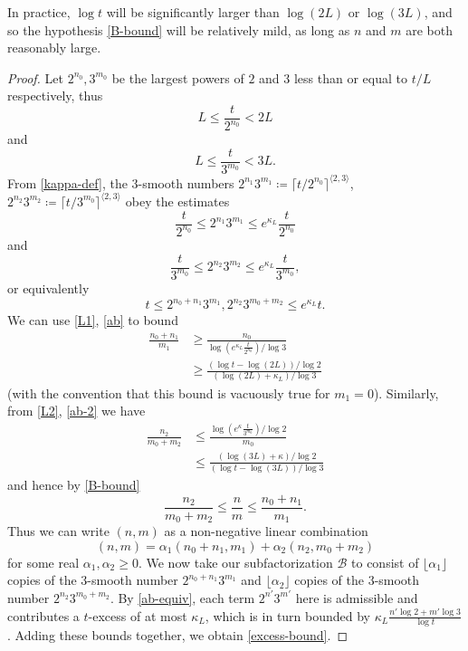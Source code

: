 \documentclass[12pt,a4paper,reqno]{amsart}
\numberwithin{equation}{section}
\theoremstyle{plain}
\theoremstyle{definition}
\newcommand\tuple{{\mathcal B}}
\begin{document}
  In practice, $\log t$ will be significantly larger than $\log(2L)$ or $\log(3L)$, and so the hypothesis \eqref{B-bound} will be relatively mild, as long as $n$ and $m$ are both reasonably large.
  
  \begin{proof}  Let $2^{n_0}, 3^{m_0}$ be the largest powers of $2$ and $3$ less than or equal to $t/L$ respectively, thus
  \begin{equation}\label{L1}
   L \leq \frac{t}{2^{n_0}} < 2L
  \end{equation}
    and
    \begin{equation}\label{L2}  L \leq \frac{t}{3^{m_0}} < 3L. \end{equation}
  From \eqref{kappa-def}, the $3$-smooth numbers $2^{n_1} 3^{m_1} \coloneqq \lceil t/2^{n_0} \rceil^{\langle 2,3 \rangle}$, $2^{n_2} 3^{m_2} \coloneqq \lceil t/3^{m_0} \rceil^{\langle 2,3 \rangle}$ obey the estimates
  \begin{equation}\label{ab} 
    \frac{t}{2^{n_0}} \leq 2^{n_1} 3^{m_1} \leq e^{\kappa_L} \frac{t}{2^{n_0}}
  \end{equation}
  and
  \begin{equation}\label{ab-2}
   \frac{t}{3^{m_0}} \leq 2^{n_2} 3^{m_2} \leq e^{\kappa_L} \frac{t}{3^{m_0}},
  \end{equation}
  or equivalently
  \begin{equation}\label{ab-equiv} 
    t \leq 2^{n_0+n_1} 3^{m_1}, 2^{n_2} 3^{m_0+m_2} \leq e^{\kappa_L} t.
  \end{equation}
  We can use \eqref{L1}, \eqref{ab} to bound
  \begin{align*}
    \frac{n_0 + n_1}{m_1} &\geq \frac{n_0}{\log (e^{\kappa_L} \frac{t}{2^{n_0}}) / \log 3} \\
    &\geq \frac{(\log t - \log(2L)) / \log 2}{ (\log(2L)+\kappa_L) / \log 3 }
  \end{align*}
  (with the convention that this bound is vacuously true for $m_1=0$). Similarly, from \eqref{L2}, \eqref{ab-2} we have
  \begin{align*}
    \frac{n_2}{m_0+m_2} &\leq \frac{\log(e^\kappa \frac{t}{3^{m_0}}) / \log 2}{m_0} \\
    &\leq \frac{(\log(3L)+\kappa)/\log 2}{(\log t-\log(3L))/\log 3}
  \end{align*}
  and hence by \eqref{B-bound}
  \begin{equation}\label{m-wedge} \frac{n_2}{m_0+m_2} \leq \frac{n}{m} \leq \frac{n_0+n_1}{m_1}.
  \end{equation}
  Thus we can write $(n,m)$ as a non-negative linear combination
  $$ (n,m) = \alpha_1 (n_0+n_1,m_1) + \alpha_2 (n_2,m_0+m_2)$$
  for some real $\alpha_1, \alpha_2 \geq 0$. We now take our subfactorization $\tuple$ to consist of $\lfloor \alpha_1 \rfloor$ copies of the $3$-smooth number $2^{n_0+n_1} 3^{m_1}$ and $\lfloor \alpha_2 \rfloor$ copies of the $3$-smooth number $2^{n_2} 3^{m_0+m_2}$.  By \eqref{ab-equiv}, each term $2^{n'} 3^{m'}$ here is admissible and contributes a $t$-excess of at most $\kappa_L$, which is in turn bounded by $\kappa_L \frac{n' \log 2 + m' \log 3}{\log t} $.  Adding these bounds together, we obtain \eqref{excess-bound}.
  

\end{proof}
\end{document}
